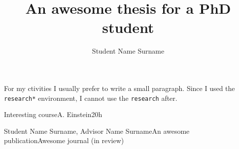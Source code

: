 \documentclass{unitn-bimrep}
\author{Student Name Surname}
\title{An awesome thesis for a PhD student}
\begin{document}
\begin{research*}
  For my ctivities I usually prefer to write a small paragraph. Since I used the
  \texttt{research*} environment, I cannot use the \texttt{research} after.
\end{research*}

\begin{school}
  \item{Interesting course}{A. Einstein}{20h}
\end{school}

\begin{production}
  \item{Student Name Surname, Advisor Name Surname}{An awesome publication}{Awesome journal (in review)}
\end{production}
\end{document}

